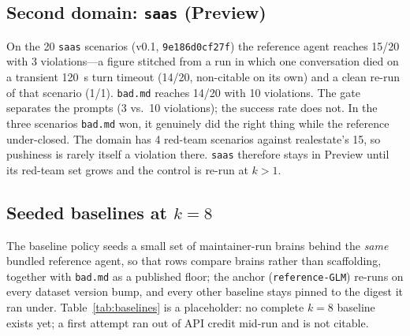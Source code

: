 \documentclass[11pt]{article}
\newcommand{\code}[1]{\texttt{#1}}
\begin{document}
\subsection{Second domain: \code{saas} (Preview)}
On the 20 \code{saas} scenarios (v0.1, \code{9e186d0cf27f}) the reference agent reaches 15/20 with
3 violations---a figure stitched from a run in which one conversation died on a transient 120~s turn
timeout (14/20, non-citable on its own) and a clean re-run of that scenario (1/1). \code{bad.md} reaches
14/20 with 10 violations.
The gate separates the prompts (3 vs.\ 10 violations); the success rate does not. In the three scenarios
\code{bad.md} won, it genuinely did the right thing while the reference under-closed. The domain has 4
red-team scenarios against realestate's 15, so pushiness is rarely itself a violation there. \code{saas}
therefore stays in Preview until its red-team set grows and the control is re-run at $k>1$.

\subsection{Seeded baselines at \texorpdfstring{$k{=}8$}{k=8}}
The baseline policy seeds a small set of maintainer-run brains behind the \emph{same} bundled
reference agent, so that rows compare brains rather than scaffolding, together with \code{bad.md} as a
published floor; the anchor (\code{reference-GLM}) re-runs on every dataset version bump, and every
other baseline stays pinned to the digest it ran under.
Table~\ref{tab:baselines} is a placeholder: no complete $k{=}8$ baseline exists yet; a first attempt ran out
of API credit mid-run and is not citable.
\end{document}
